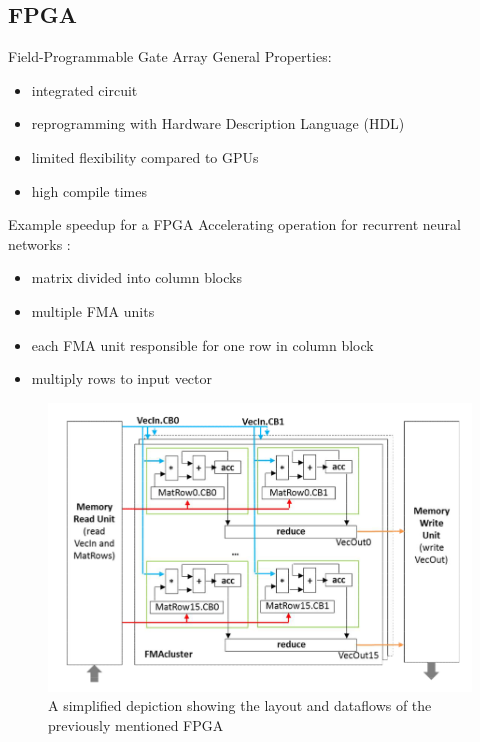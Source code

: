 \documentclass[en]{sdqbeamer}
\begin{document}
	\subsection{FPGA}
	\begin{frame}{Field-Programmable Gate Array}
		General Properties:
		\begin{itemize}
			\item integrated circuit
			\item reprogramming with Hardware Description Language (HDL)
			\item limited flexibility compared to GPUs
			\item high compile times
		\end{itemize}
	\end{frame}
	
	\begin{frame}{Example speedup for a FPGA}
		Accelerating operation for recurrent neural networks \cite{nurvitadhi2016accelerating}:
		\begin{itemize}
			\item matrix divided into column blocks
			\item multiple FMA units
			\item each FMA unit responsible for one row in column block
			\item multiply rows to input vector
		\end{itemize}
	\end{frame}
	
	\begin{frame}
		\begin{figure}
			\centering
			\includegraphics[width= 0.55\paperwidth]{pictures/fpga_operations.png}
			\caption{A simplified depiction showing the layout and dataflows of the previously mentioned FPGA \cite{nurvitadhi2016accelerating}}
		\end{figure}
	\end{frame}
	
\end{document}
